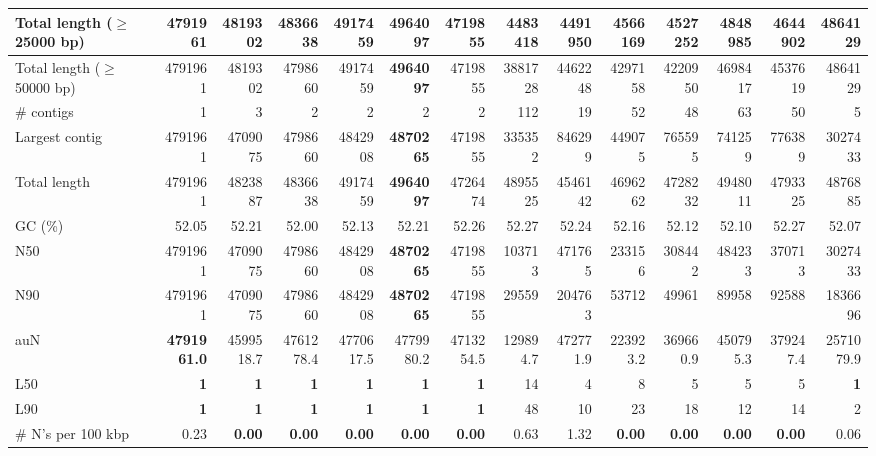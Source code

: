 \documentclass[12pt,a4paper]{article}
\begin{document}
\begin{table}[ht]
\begin{center}
\begin{tabular}{|l*{13}{|r}|}
Total length ($\geq$ 25000 bp) & 4791961 & 4819302 & 4836638 & 4917459 & {\bf 4964097} & 4719855 & 4483418 & 4491950 & 4566169 & 4527252 & 4848985 & 4644902 & 4864129 \\ \hline
Total length ($\geq$ 50000 bp) & 4791961 & 4819302 & 4798660 & 4917459 & {\bf 4964097} & 4719855 & 3881728 & 4462248 & 4297158 & 4220950 & 4698417 & 4537619 & 4864129 \\ \hline
\# contigs & 1 & 3 & 2 & 2 & 2 & 2 & 112 & 19 & 52 & 48 & 63 & 50 & 5 \\ \hline
Largest contig & 4791961 & 4709075 & 4798660 & 4842908 & {\bf 4870265} & 4719855 & 335352 & 846299 & 449075 & 765595 & 741259 & 776389 & 3027433 \\ \hline
Total length & 4791961 & 4823887 & 4836638 & 4917459 & {\bf 4964097} & 4726474 & 4895525 & 4546142 & 4696262 & 4728232 & 4948011 & 4793325 & 4876885 \\ \hline
GC (\%) & 52.05 & 52.21 & 52.00 & 52.13 & 52.21 & 52.26 & 52.27 & 52.24 & 52.16 & 52.12 & 52.10 & 52.27 & 52.07 \\ \hline
N50 & 4791961 & 4709075 & 4798660 & 4842908 & {\bf 4870265} & 4719855 & 103713 & 471765 & 233156 & 308442 & 484233 & 370713 & 3027433 \\ \hline
N90 & 4791961 & 4709075 & 4798660 & 4842908 & {\bf 4870265} & 4719855 & 29559 & 204763 & 53712 & 49961 & 89958 & 92588 & 1836696 \\ \hline
auN & {\bf 4791961.0} & 4599518.7 & 4761278.4 & 4770617.5 & 4779980.2 & 4713254.5 & 129894.7 & 472771.9 & 223923.2 & 369660.9 & 450795.3 & 379247.4 & 2571079.9 \\ \hline
L50 & {\bf 1} & {\bf 1} & {\bf 1} & {\bf 1} & {\bf 1} & {\bf 1} & 14 & 4 & 8 & 5 & 5 & 5 & {\bf 1} \\ \hline
L90 & {\bf 1} & {\bf 1} & {\bf 1} & {\bf 1} & {\bf 1} & {\bf 1} & 48 & 10 & 23 & 18 & 12 & 14 & 2 \\ \hline
\# N's per 100 kbp & 0.23 & {\bf 0.00} & {\bf 0.00} & {\bf 0.00} & {\bf 0.00} & {\bf 0.00} & 0.63 & 1.32 & {\bf 0.00} & {\bf 0.00} & {\bf 0.00} & {\bf 0.00} & 0.06 \\ \hline
\end{tabular}
\end{center}
\end{table}
\end{document}
